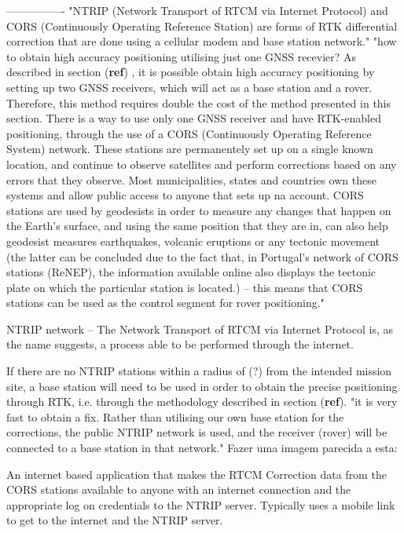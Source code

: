 ----------------
"NTRIP (Network Transport of RTCM via Internet Protocol) and CORS (Continuously Operating Reference Station) are forms of RTK differential correction that are done using a cellular modem and base station network."
"how to obtain high accuracy positioning utilising just one GNSS recevier?
As described in section (\textbf{ref}) , it is possible obtain high accuracy positioning by setting up two GNSS receivers, which will act as a base station and a rover. Therefore, this method requires double the cost of the method presented in this section. There is a way to use only one GNSS receiver and have RTK-enabled positioning, through the use of a CORS (Continuously Operating Reference System) network. These stations are permanentely set up on a single known location, and continue to observe satellites and perform corrections based on any errors that they observe. Most municipalities, states and countries own these systems and allow public access to anyone that sets up na account. CORS stations are used by geodesists in order to measure any changes that happen on the Earth's surface, and using the same position that they are in, can also help geodesist measures earthquakes, volcanic eruptions or any tectonic movement (the latter can be concluded due to the fact that, in Portugal's network of CORS stations (ReNEP), the information available online also displays the tectonic plate on which the particular station is located.) -- this means that CORS stations can be used as the control segment for rover positioning."


NTRIP network -- The Network Transport of RTCM via Internet Protocol is, as the name suggests, a process able to be performed through the internet.

If there are no NTRIP stations within a radius of (?) from the intended mission site, a base station will need to be used in order to obtain the precise positioning through RTK, i.e. through the methodology described in section (\textbf{ref}).
"it is very fast to obtain a fix. Rather than utilising our own base station for the corrections, the public NTRIP network is used, and the receiver (rover) will be connected to a base station in that network."
Fazer uma imagem parecida a esta: %

An internet based application that makes the RTCM Correction data from the CORS stations available to anyone with an internet connection and the appropriate log on credentials to the NTRIP server. Typically uses a mobile link to get to the internet and the NTRIP server. %

